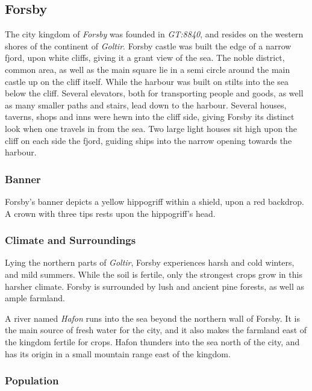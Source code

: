 \subsection*{Forsby}


The city kingdom of \emph{Forsby} was founded in \emph{GT:8840}, and resides
on the western shores of the continent of \emph{Goltir}. Forsby castle was
built the edge of a narrow fjord, upon white cliffs, giving it a grant view of
the sea. The noble district, common area, as well as the main square lie in a
semi circle around the main castle up on the cliff itself. While the harbour
was built on stilts into the sea below the cliff. Several elevators, both for
transporting people and goods, as well as many smaller paths and stairs, lead
down to the harbour. Several houses, taverns, shops and inns were hewn into
the cliff side, giving Forsby its distinct look when one travels in from the
sea. Two large light houses sit high upon the cliff on each side the fjord,
guiding ships into the narrow opening towards the harbour.

\subsubsection*{Banner}

Forsby's banner depicts a yellow hippogriff within a shield, upon a red
backdrop. A crown with three tips rests upon the hippogriff's head.

\subsubsection*{Climate and Surroundings}

Lying the northern parts of \emph{Goltir}, Forsby experiences harsh and cold
winters, and mild summers. While the soil is fertile, only the strongest crops
grow in this harsher climate. Forsby is surrounded by lush and ancient pine
forests, as well as ample farmland.

A river named \emph{Hafon} runs into the sea beyond the northern wall of
Forsby. It is the main source of fresh water for the city, and it also makes
the farmland east of the kingdom fertile for crops. Hafon thunders into the
sea north of the city, and has its origin in a small mountain range east of
the kingdom.

\subsubsection*{Population}

